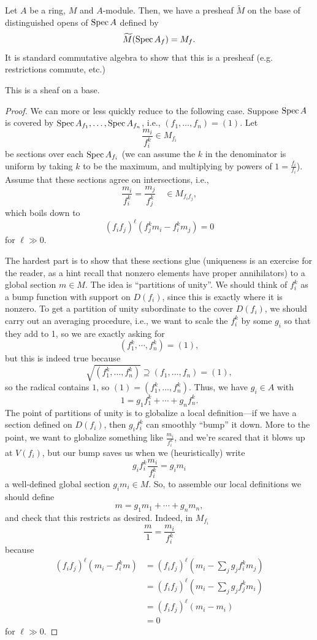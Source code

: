 \documentclass[12pt]{article}
\begin{document}
Let $A$ be a ring, $M$ and $A$-module. Then, we have a presheaf $\tilde{M}$ on the base of distinguished opens of $\operatorname{Spec} A$ defined by
\[\widetilde{M}(\operatorname{Spec} A_f) = M_f.\]
It is standard commutative algebra to show that this is a presheaf (e.g. restrictions commute, etc.)
\begin{prop}
    This is a sheaf on a base.
\end{prop}
\begin{proof}
    We can more or less quickly reduce to the following case. Suppose $\operatorname{Spec} A$ is covered by $\operatorname{Spec} A_{f_1}, \dots, \operatorname{Spec} A_{f_n}$, i.e., $(f_1,\dots,f_n)=(1)$. Let
    \[\frac{m_i}{f_i^k} \in M_{f_i}\]
    be sections over each $\operatorname{Spec} A_{f_i}$ (we can assume the $k$ in the denominator is uniform by taking $k$ to be the maximum, and multiplying by powers of $1 = \frac{f_i}{f_i}$). Assume that these sections agree on intersections, i.e.,
    \[\frac{m_i}{f_i^k} = \frac{m_j}{f_j^k} \quad \in M_{f_i f_j},\]
    which boils down to
    \[(f_i f_j)^\ell (f_j^k m_i - f_i^k m_j) = 0 \tag{$*$}\]
    for $\ell \gg 0$.

    The hardest part is to show that these sections glue (uniqueness is an exercise for the reader, as a hint recall that nonzero elements have proper annihilators) to a global section $m\in M$. The idea is ``partitions of unity''. We should think of $f_i^k$ as a bump function with support on $D(f_i)$, since this is exactly where it is nonzero. To get a partition of unity subordinate to the cover $D(f_i)$, we should carry out an averaging procedure, i.e., we want to scale the $f_i^k$ by some $g_i$ so that they add to 1, so we are exactly asking for
    \[(f_1^k,\cdots,f_n^k) = (1),\]
    but this is indeed true because
    \[\sqrt{(f_1^k,\dots,f_n^k)} \supseteq (f_1,\dots,f_n) = (1),\]
    so the radical contains $1$, so $(1)=(f_1^k,\dots,f_n^k)$. Thus, we have $g_i\in A$ with
    \[1 = g_1 f_1^k + \cdots + g_n f_n^k.\]
    The point of partitions of unity is to globalize a local definition---if we have a section defined on $D(f_i)$, then $g_i f_i^k$ can smoothly ``bump'' it down. More to the point, we want to globalize something like $\frac{m_i}{f_i^k}$, and we're scared that it blows up at $V(f_i)$, but our bump saves us when we (heuristically) write
    \[g_i f_i^k \frac{m_i}{f_i^k} = g_i m_i\]
    a well-defined global section $g_i m_i \in M$. So, to assemble our local definitions we should define
    \[m = g_1 m_1 + \cdots + g_n m_n,\]
    and check that this restricts as desired. Indeed, in $M_{f_i}$
    \[\frac{m}{1} = \frac{m_i}{f_i^k}\]
    because
    \begin{align*}
        (f_i f_j)^\ell (m_i - f_i^k m) &= (f_i f_j)^\ell (m_i - \sum_j g_j f_i^k m_j)\\
        &= (f_i f_j)^\ell (m_i - \sum_j g_j f_j^k m_i)\tag{by ($*$)}\\
        &= (f_i f_j)^\ell (m_i - m_i)\\
        &= 0
    \end{align*}
    for $\ell \gg 0$.
\end{proof}
\end{document}
